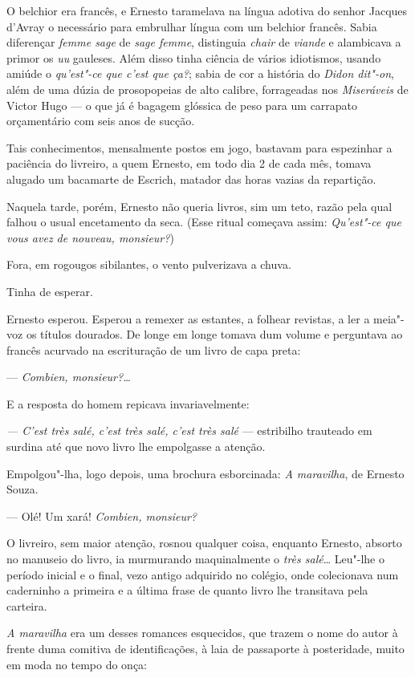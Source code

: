 O belchior era francês, e Ernesto taramelava na língua adotiva do senhor
Jacques d'Avray o necessário para embrulhar língua com um belchior
francês. Sabia diferençar \emph{femme sage} de \emph{sage femme},
distinguia \emph{chair} de \emph{viande} e alambicava a primor os
\emph{uu} gauleses. Além disso tinha ciência de vários idiotismos,
usando amiúde o \emph{qu'est"-ce que c'est que ça?}; sabia de cor a
história do \emph{Didon dit"-on}, além de uma dúzia de prosopopeias de
alto calibre, forrageadas nos \emph{Miseráveis} de Victor Hugo --- o que
já é bagagem glóssica de peso para um carrapato orçamentário com seis
anos de sucção.

Tais conhecimentos, mensalmente postos em jogo, bastavam para espezinhar
a paciência do livreiro, a quem Ernesto, em todo dia 2 de cada mês,
tomava alugado um bacamarte de Escrich, matador das horas vazias da
repartição.

Naquela tarde, porém, Ernesto não queria livros, sim um teto, razão pela
qual falhou o usual encetamento da seca. (Esse ritual começava assim:
\emph{Qu'est"-ce que vous avez de nouveau, monsieur?})

Fora, em rogougos sibilantes, o vento pulverizava a chuva.

Tinha de esperar.

Ernesto esperou. Esperou a remexer as estantes, a folhear revistas, a
ler a meia"-voz os títulos dourados. De longe em longe tomava dum volume
e perguntava ao francês acurvado na escrituração de um livro de capa
preta:

--- \emph{Combien, monsieur?\ldots{}}

E a resposta do homem repicava invariavelmente:

\emph{--- C'est très salé, c'est très salé, c'est très salé} ---
estribilho trauteado em surdina até que novo livro lhe empolgasse a
atenção.

Empolgou"-lha, logo depois, uma brochura esborcinada: \emph{A maravilha},
de Ernesto Souza.

--- Olé! Um xará! \emph{Combien, monsieur?}

O livreiro, sem maior atenção, rosnou qualquer coisa, enquanto Ernesto,
absorto no manuseio do livro, ia murmurando maquinalmente o \emph{très
salé}\ldots{} Leu"-lhe o período inicial e o final, vezo antigo adquirido no
colégio, onde colecionava num caderninho a primeira e a última frase de
quanto livro lhe transitava pela carteira.

\emph{A maravilha} era um desses romances esquecidos, que trazem o nome
do autor à frente duma comitiva de identificações, à laia de passaporte
à posteridade, muito em moda no tempo do onça:

